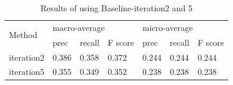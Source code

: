 \begin{table}[!t]
\centering
\caption{Results of using Baseline-iteration2 and 5}
\label{table:microblogbase}
\begin{tabular}{|l|l|l|l|l|l|l|}
\hline
\multirow{2}{*}{Method} & \multicolumn{3}{|l|}{macro-average} & \multicolumn{3}{|l|}{micro-average} \\ \cline{2-7}
& prec & recall & F score & prec & recall & F score \\ \hline
iteration2 & 0.386 & 0.358 & 0.372 & 0.244 & 0.244 & 0.244 \\ \hline
iteration5 & 0.355 & 0.349 & 0.352 & 0.238 & 0.238 & 0.238 \\ \hline
\end{tabular}
\end{table}
